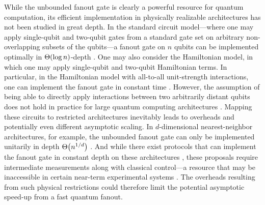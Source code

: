 While the unbounded fanout gate is clearly a powerful resource for quantum computation, its efficient implementation in physically realizable architectures has not been studied in great depth.
In the standard circuit model---where one may apply single-qubit and two-qubit gates from a standard gate set on arbitrary non-overlapping subsets of the qubits---a fanout gate on $n$ qubits can be implemented optimally in $\Th{\log{n}}$-depth \cite{Broadbent2009a}.
One may also consider the Hamiltonian model, in which one may apply single-qubit and two-qubit Hamiltonian terms.
In particular, in the Hamiltonian model with all-to-all unit-strength interactions, one can implement the fanout gate in constant time \cite{Fenner2003,Fenner2004}.
However, the assumption of being able to directly apply interactions between two arbitrarily distant qubits does not hold in practice for large quantum computing architectures \cite{Monroe2014,Linke2017,Bapat2018,Childs2019c}.
Mapping these circuits to restricted architectures inevitably leads to overheads and potentially even different asymptotic scaling.
In $d$-dimensional nearest-neighbor architectures, for example, the unbounded fanout gate can only be implemented unitarily in depth $\Th{n^{1/d}}$ \cite{Rosenbaum2013}.
And while there exist protocols that can implement the fanout gate in constant depth on these architectures \cite{Pham2013}, these proposals require intermediate measurements along with classical control---a resource that may be inaccessible in certain near-term experimental systems \cite{Arute2019}.
The overheads resulting from such physical restrictions could therefore limit the potential asymptotic speed-up from a fast quantum fanout.


